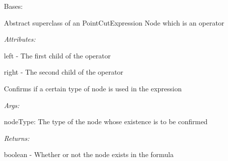 \documentclass[letterpaper,10pt,english]{sphinxmanual}
\begin{document}
\begin{fulllineitems}
\label{modules/index:aosb.core.PointCutExpressionOperator}
Bases: {\hyperref[modules/index:aosb.core.PointCutExpressionNode]{}}

Abstract superclass of an PointCutExpression Node which is an operator

\begin{DUlineblock}{0em}
\item[] \emph{Attributes:}
\item[]
\begin{DUlineblock}{\DUlineblockindent}
\item[] left - The first child of the operator
\item[] right - The second child of the operator
\end{DUlineblock}
\end{DUlineblock}

\begin{fulllineitems}
\label{modules/index:aosb.core.PointCutExpressionOperator.expressionUses}
Confirms if a certain type of node is used in the expression

\begin{DUlineblock}{0em}
\item[] \emph{Args:}
\item[]
\begin{DUlineblock}{\DUlineblockindent}
\item[] nodeType: The type of the node whose existence is to be confirmed
\end{DUlineblock}
\end{DUlineblock}

\begin{DUlineblock}{0em}
\item[] \emph{Returns:}
\item[]
\begin{DUlineblock}{\DUlineblockindent}
\item[] boolean - Whether or not the node exists in the formula
\end{DUlineblock}
\end{DUlineblock}

\end{fulllineitems}


\end{fulllineitems}
\end{document}
